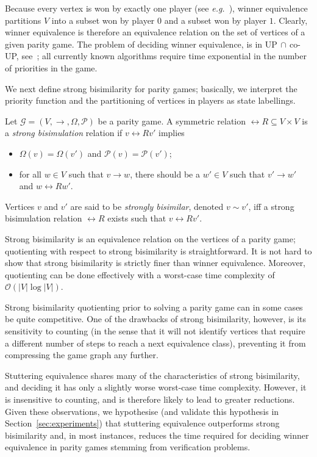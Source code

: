 \documentclass[a4paper]{llncs}
\newcommand{\eg}{\textit{e.g.}\xspace}
\newcommand{\R}{\ensuremath{\rel{R}}}
\newcommand{\game}{\ensuremath{\mathcal{G}}\xspace}
\newcommand{\even}{\ensuremath{0}\xspace}
\newcommand{\odd}{\ensuremath{1}\xspace}
\newcommand{\priority}{\ensuremath{\Omega}\xspace}
\newcommand{\getplayername}{\ensuremath{\mathcal{P}}}
\newcommand{\getplayer}[1]{\getplayername(#1)}
\renewcommand{\sb}{\sim}
\begin{document}
Because every vertex is won by exactly one player (see \eg~\cite{Zie:98}),
winner equivalence partitions $V$ into a subset won by player $\even$
and a subset won by player $\odd$. Clearly, winner equivalence is therefore 
an equivalence relation on the set of vertices of a given parity game.  
The problem of deciding winner equivalence, is in UP$\,\cap\,$co-UP, 
see~\cite{Jur:98}; all currently known algorithms require time 
exponential in the number of priorities in the game.

We next define strong bisimilarity for parity games; basically, we
interpret the priority function and the partitioning of vertices in players
as state labellings.

\begin{definition}
Let $\game = (V,\to,\priority,\getplayername)$ be a parity game. A
symmetric relation $\R \subseteq V \times V$ is a \emph{strong bisimulation}
relation if $v \R v'$ implies
\begin{itemize}
\item $\priority(v) = \priority(v')$ and $\getplayer{v} = \getplayer{v'}$;
\item for all $w \in V$ such that $v \to w$, there should be a 
$w' \in V$ such that $v' \to w'$ and $w \R w'$.
\end{itemize}
Vertices $v$ and $v'$ are said to be \emph{strongly bisimilar},
denoted $v \sb v'$, iff a strong bisimulation relation $\R$ exists
such that $v \R v'$.

\end{definition}
Strong bisimilarity is an equivalence relation on the vertices
of a parity game; quotienting with respect to strong bisimilarity is
straightforward. It is not hard to show that strong bisimilarity is
strictly finer than winner equivalence.  Moreover, quotienting can be
done effectively with a worst-case time complexity of $\mathcal{O}(|V|
\log |V|)$.  

Strong bisimilarity quotienting prior to solving a parity game can in some
cases be quite competitive. One of the drawbacks of strong bisimilarity,
however, is its sensitivity to counting (in the sense that it will not
identify vertices that require a different number of steps to reach a
next equivalence class), preventing it from compressing the game graph
any further.

Stuttering equivalence shares many of the characteristics
of strong bisimilarity, and deciding it has only a slightly worse
worst-case time complexity. However, it is insensitive to counting,
and is therefore likely to lead to greater reductions. Given these
observations, we hypothesise (and validate this hypothesis in
Section~\ref{sec:experiments}) that stuttering equivalence
outperforms strong bisimilarity and, in most instances, reduces the time
required for deciding winner equivalence in parity games stemming from
verification problems.
\end{document}
